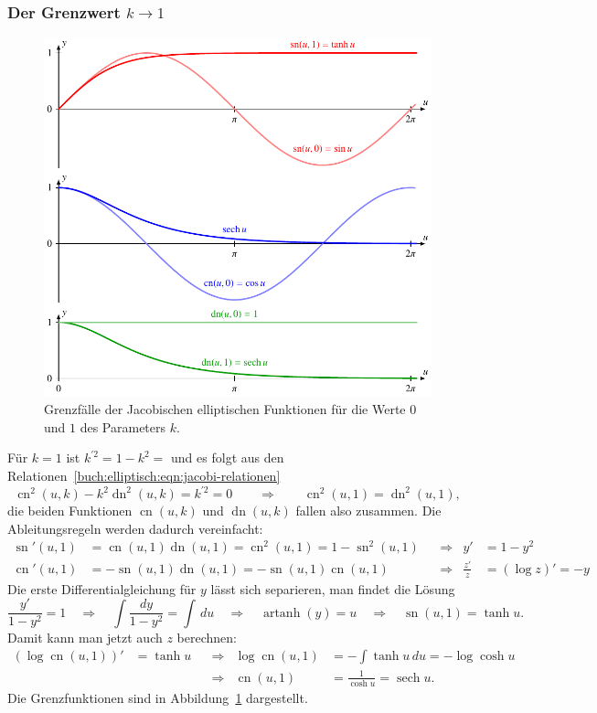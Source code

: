 \subsubsection{Der Grenzwert $k\to1$}
\begin{figure}
\centering
\includegraphics{chapters/110-elliptisch/images/sncnlimit.pdf}
\caption{Grenzfälle der Jacobischen elliptischen Funktionen 
für die Werte $0$ und $1$ des Parameters $k$.
\label{buch:elliptisch:fig:sncnlimit}}
\end{figure}
Für $k=1$ ist $k^{\prime2}=1-k^2=$ und es folgt aus den
Relationen~\eqref{buch:elliptisch:eqn:jacobi-relationen}
\[
\operatorname{cn}^2(u,k)
-
k^2
\operatorname{dn}^2(u,k)
=
k^{\prime2}
=
0
\qquad\Rightarrow\qquad
\operatorname{cn}^2(u,1)
=
\operatorname{dn}^2(u,1),
\]
die beiden Funktionen
$\operatorname{cn}(u,k)$
und
$\operatorname{dn}(u,k)$
fallen also zusammen.
Die Ableitungsregeln werden dadurch vereinfacht:
\begin{align*}
\operatorname{sn}'(u,1)
&=
\operatorname{cn}(u,1)
\operatorname{dn}(u,1)
=
\operatorname{cn}^2(u,1)
=
1-\operatorname{sn}^2(u,1)
&&\Rightarrow& y'&=1-y^2
\\
\operatorname{cn}'(u,1)
&=
-
\operatorname{sn}(u,1)
\operatorname{dn}(u,1)
=
-
\operatorname{sn}(u,1)\operatorname{cn}(u,1)
&&\Rightarrow&
\frac{z'}{z}&=(\log z)' = -y
\end{align*}
Die erste Differentialgleichung für $y$ lässt sich separieren, man findet
die Lösung
\[
\frac{y'}{1-y^2}
=
1
\quad\Rightarrow\quad
\int \frac{dy}{1-y^2} = \int \,du
\quad\Rightarrow\quad
\operatorname{artanh}(y) = u
\quad\Rightarrow\quad
\operatorname{sn}(u,1)=\tanh u.
\]
Damit kann man jetzt auch $z$ berechnen:
\begin{align*}
(\log \operatorname{cn}(u,1))'
&=
\tanh u
&&\Rightarrow&
\log\operatorname{cn}(u,1)
&=
-\int\tanh u\,du
=
-\log\cosh u
\\
&
&&\Rightarrow&
\operatorname{cn}(u,1)
&=
\frac{1}{\cosh u}
=
\operatorname{sech}u.
\end{align*}
Die Grenzfunktionen sind in Abbildung~\ref{buch:elliptisch:fig:sncnlimit}
dargestellt.

